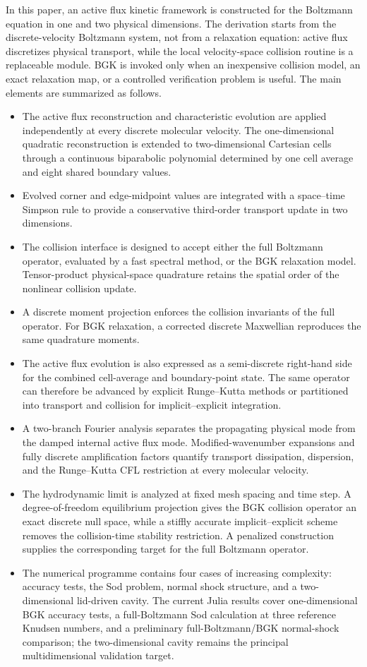 \documentclass[preprint,3p,12pt]{elsarticle}
\begin{document}
In this paper, an active flux kinetic framework is constructed for the Boltzmann equation in one and two physical dimensions. The derivation starts from the discrete-velocity Boltzmann system, not from a relaxation equation: active flux discretizes physical transport, while the local velocity-space collision routine is a replaceable module. BGK is invoked only when an inexpensive collision model, an exact relaxation map, or a controlled verification problem is useful. The main elements are summarized as follows.
\begin{itemize}
  \item The active flux reconstruction and characteristic evolution are applied independently at every discrete molecular velocity. The one-dimensional quadratic reconstruction is extended to two-dimensional Cartesian cells through a continuous biparabolic polynomial determined by one cell average and eight shared boundary values.
  \item Evolved corner and edge-midpoint values are integrated with a space--time Simpson rule to provide a conservative third-order transport update in two dimensions.
  \item The collision interface is designed to accept either the full Boltzmann operator, evaluated by a fast spectral method, or the BGK relaxation model. Tensor-product physical-space quadrature retains the spatial order of the nonlinear collision update.
  \item A discrete moment projection enforces the collision invariants of the full operator. For BGK relaxation, a corrected discrete Maxwellian reproduces the same quadrature moments.
  \item The active flux evolution is also expressed as a semi-discrete right-hand side for the combined cell-average and boundary-point state. The same operator can therefore be advanced by explicit Runge--Kutta methods or partitioned into transport and collision for implicit--explicit integration.
  \item A two-branch Fourier analysis separates the propagating physical mode from the damped internal active flux mode. Modified-wavenumber expansions and fully discrete amplification factors quantify transport dissipation, dispersion, and the Runge--Kutta CFL restriction at every molecular velocity.
  \item The hydrodynamic limit is analyzed at fixed mesh spacing and time step. A degree-of-freedom equilibrium projection gives the BGK collision operator an exact discrete null space, while a stiffly accurate implicit--explicit scheme removes the collision-time stability restriction. A penalized construction supplies the corresponding target for the full Boltzmann operator.
  \item The numerical programme contains four cases of increasing complexity: accuracy tests, the Sod problem, normal shock structure, and a two-dimensional lid-driven cavity. The current Julia results cover one-dimensional BGK accuracy tests, a full-Boltzmann Sod calculation at three reference Knudsen numbers, and a preliminary full-Boltzmann/BGK normal-shock comparison; the two-dimensional cavity remains the principal multidimensional validation target.
\end{itemize}
\end{document}
